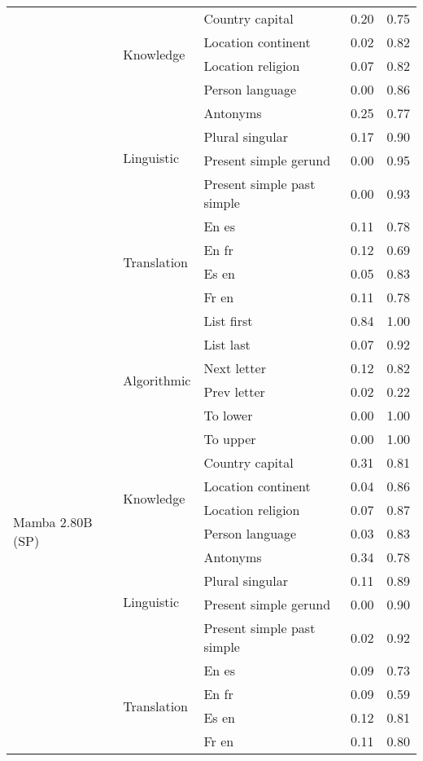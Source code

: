 \begin{center}
\begin{longtable}{lllrr}
 & \multirow[t]{4}{*}{Knowledge} & Country capital & 0.20 & 0.75 \\
 &  & Location continent & 0.02 & 0.82 \\
 &  & Location religion & 0.07 & 0.82 \\
 &  & Person language & 0.00 & 0.86 \\
\cline{2-5}
 & \multirow[t]{4}{*}{Linguistic} & Antonyms & 0.25 & 0.77 \\
 &  & Plural singular & 0.17 & 0.90 \\
 &  & Present simple gerund & 0.00 & 0.95 \\
 &  & Present simple past simple & 0.00 & 0.93 \\
\cline{2-5}
 & \multirow[t]{4}{*}{Translation} & En es & 0.11 & 0.78 \\
 &  & En fr & 0.12 & 0.69 \\
 &  & Es en & 0.05 & 0.83 \\
 &  & Fr en & 0.11 & 0.78 \\
\cline{1-5} \cline{2-5}
\multirow[t]{18}{*}{Mamba 2.80B (SP)} & \multirow[t]{6}{*}{Algorithmic} & List first & 0.84 & 1.00 \\
 &  & List last & 0.07 & 0.92 \\
 &  & Next letter & 0.12 & 0.82 \\
 &  & Prev letter & 0.02 & 0.22 \\
 &  & To lower & 0.00 & 1.00 \\
 &  & To upper & 0.00 & 1.00 \\
\cline{2-5}
 & \multirow[t]{4}{*}{Knowledge} & Country capital & 0.31 & 0.81 \\
 &  & Location continent & 0.04 & 0.86 \\
 &  & Location religion & 0.07 & 0.87 \\
 &  & Person language & 0.03 & 0.83 \\
\cline{2-5}
 & \multirow[t]{4}{*}{Linguistic} & Antonyms & 0.34 & 0.78 \\
 &  & Plural singular & 0.11 & 0.89 \\
 &  & Present simple gerund & 0.00 & 0.90 \\
 &  & Present simple past simple & 0.02 & 0.92 \\
\cline{2-5}
 & \multirow[t]{4}{*}{Translation} & En es & 0.09 & 0.73 \\
 &  & En fr & 0.09 & 0.59 \\
 &  & Es en & 0.12 & 0.81 \\
 &  & Fr en & 0.11 & 0.80 \\

\end{longtable}
\end{center}
